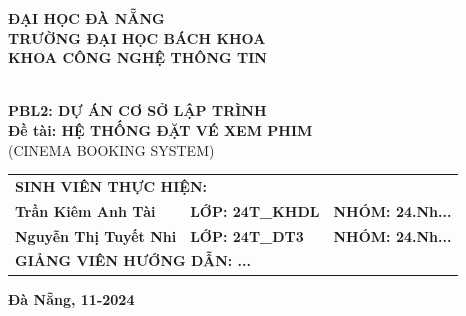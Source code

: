 \documentclass[12pt,a4paper]{article}
\begin{document}
\begin{titlepage}
    \thispagestyle{empty}
    \begin{center}
        \textbf{\large ĐẠI HỌC ĐÀ NẴNG}\\[0.2cm]
        \textbf{\large TRƯỜNG ĐẠI HỌC BÁCH KHOA}\\[0.2cm]
        \textbf{\large KHOA CÔNG NGHỆ THÔNG TIN}\\[1.5cm]

        \\[2.2cm]

        {\textbf{\Huge PBL2: DỰ ÁN CƠ SỞ LẬP TRÌNH}}\\[1cm]
        {\textbf{\Large Đề tài: HỆ THỐNG ĐẶT VÉ XEM PHIM}}\\[0.3cm]
        {\large (CINEMA BOOKING SYSTEM)}\\[4cm]

        \begin{flushleft}
        \hspace*{1.8cm}
        \begin{tabular}{lll}
            \multicolumn{3}{l}{\textbf{SINH VIÊN THỰC HIỆN:}}\\[0.2cm]
            \textbf{Trần Kiêm Anh Tài} & \textbf{LỚP: 24T\_KHDL} & \textbf{NHÓM: 24.Nh...}\\
            \textbf{Nguyễn Thị Tuyết Nhi} & \textbf{LỚP: 24T\_DT3} & \textbf{NHÓM: 24.Nh...}\\[0.3cm]
            \multicolumn{3}{l}{\textbf{GIẢNG VIÊN HƯỚNG DẪN: ...}}
        \end{tabular}
        \end{flushleft}

        \vfill
        {\textbf{\large Đà Nẵng, 11-2024}}
    \end{center}
\end{titlepage}

\newpage
{}
\setcounter{page}{3} %
\end{document}
